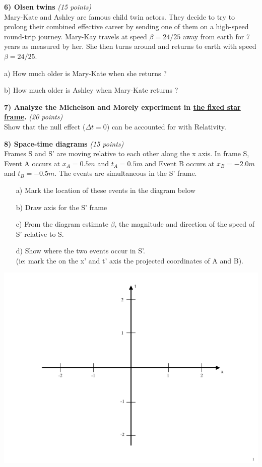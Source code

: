 {\textbf{6) Olsen twins}  \hfill \textit{(15 points)}\\
Mary-Kate and Ashley are famous child twin actors.
They decide to try to prolong their combined effective career by sending one of them on a high-speed round-trip journey. 
Mary-Kay travels at speed $\beta = 24/25$ away from earth for 7 years as measured by her.
She then turns around and returns to earth with speed $\beta = 24/25$.

a) How much older is Mary-Kate when she returns ?

b) How much older is Ashley when Mary-Kate returns ?


\clearpage


\textbf{7) Analyze the Michelson and Morely experiment in \underline{the fixed star frame}.}  \hfill \textit{(20 points)}\\
Show that the null effect  ($\Delta t = 0$) can be accounted for with Relativity.

\clearpage
\textbf{8) Space-time diagrams}  \hfill \textit{(15 points)}\\
Frames S and S' are moving relative to each other along the x axis.
In frame S, Event A occurs at $x_A = 0.5 m$ and $t_A = 0.5 m$ and Event B occurs at $x_B = -2.0 m$ and $t_B = -0.5 m$.
The events are simultaneous in the S' frame.
\begin{itemize}
\item[a)] Mark the location of these events in the diagram below
\item[b)] Draw axis for the S' frame
\item[c)] From the diagram estimate $\beta$,  the magnitude and direction of the speed of S' relative to S.
\item[d)] Show where the two events occur in S'. \\(ie: mark the on the x' and t' axis the projected coordinates of A and B).
\end{itemize}
\vspace*{0.1in}

\includegraphics[width=1\textwidth]{./AxesCropped.pdf}



} %

